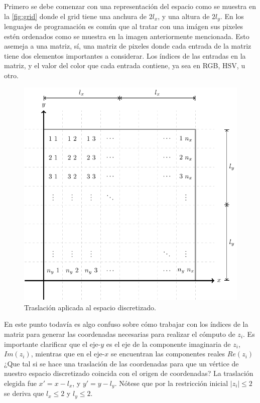 Primero se debe comenzar con una representación del espacio como se muestra en la \cref{fig:grid} donde el grid tiene una anchura de $2 l_x$, y una altura de $2 l_y$. En los lenguajes de programación es común que al tratar con una imágen sus pixeles estén ordenados como se muestra en la imagen anteriormente mencionada. Esto asemeja a una matriz, sí, una matriz de pixeles donde cada entrada de la matriz tiene dos elementos importantes a considerar. Los índices de las entradas en la matriz, y el valor del color que cada entrada contiene, ya sea en RGB, HSV, u otro.

\begin{figure}[ht!]
    \centering
    \includegraphics[scale=0.75]{../figures/grid-translated/grid-translated}
    \caption{Traslación aplicada al espacio discretizado.}
    \label{fig:grid-moved}
\end{figure}

En este punto todavía es algo confuso sobre cómo trabajar con los índices de la matriz para generar las coordenadas necesarias para realizar el cómputo de $z_i$. Es importante clarificar que el eje-$y$ es el eje de la componente imaginaria de $z_i$, $Im(z_i)$, mientras que en el eje-$x$ se encuentran las componentes reales $Re(z_i)$ ¿Que tal si se hace una traslación de las coordenadas para que un vértice de nuestro espacio discretizado coincida con el origen de coordenadas? La traslación elegida fue $x' = x - l_x$, y $y' = y - l_y$. Nótese que por la restricción inicial $|z_i| \leq 2$ se deriva que $l_x \leq 2$ y $l_y \leq 2$.

